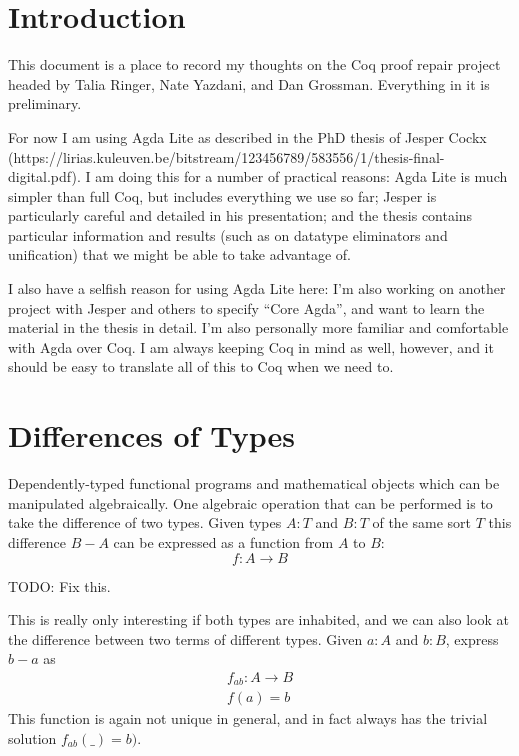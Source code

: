 \documentclass[acmlarge,fleqn]{acmart}\settopmatter{}
\begin{document}
\section{Introduction}

This document is a place to record my thoughts on the Coq proof
repair project headed by Talia Ringer, Nate Yazdani, and Dan
Grossman.  Everything in it is preliminary.

For now I am using Agda Lite as described in the PhD thesis of Jesper
Cockx\\
(https://lirias.kuleuven.be/bitstream/123456789/583556/1/thesis-final-digital.pdf).
I am doing this for a number of practical reasons: Agda Lite is much
simpler than full Coq, but includes everything we use so far; Jesper
is particularly careful and detailed in his presentation; and the
thesis contains particular information and results (such as on
datatype eliminators and unification) that we might be able to take
advantage of.

I also have a selfish reason for using Agda Lite here: I'm also
working on another project with Jesper and others to specify ``Core
Agda'', and want to learn the material in the thesis in detail.  I'm
also personally more familiar and comfortable with Agda over Coq.  I
am always keeping Coq in mind as well, however, and it should be easy
to translate all of this to Coq when we need to.

\section{Differences of Types}

Dependently-typed functional programs and mathematical objects which
can be manipulated algebraically.  One algebraic operation that can be
performed is to take the difference of two types.  Given types $A : T$
and $B : T$ of the same sort $T$ this difference $B - A$ can be
expressed as a function from $A$ to $B$:
\[
f : A \to B
\]

TODO: Fix this.

This is really only interesting if both types are inhabited, and we
can also look at the difference between two terms of different types.
Given $a : A$ and $b : B$, express $b-a$ as
\begin{gather*}
f_{ab} : A \to B\\
f(a) = b
\end{gather*}
This function is again not unique in general, and in fact always has
the trivial solution $f_{ab}(\_) = b)$.
\end{document}
